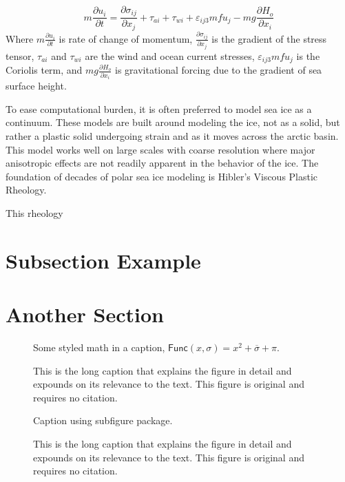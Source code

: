 \begin{equation}
m\frac{\partial u_i}{\partial t}=
\frac{\partial \sigma_{ij}}{\partial x_j}+ 
\tau_{ai}+\tau_{wi}+\varepsilon_{ij3}mfu_j-
mg\frac{\partial H_o}{\partial x_i}
\end{equation}
Where $m\frac{\partial u_i}{\partial t}$ is rate of change of momentum, $\frac{\partial \sigma_{ij}}{\partial x_j}$ is the gradient of the stress tensor, $\tau_{ai}$ and $\tau_{wi}$ are the wind and ocean current stresses, $\varepsilon_{ij3}mfu_j$ is the Coriolis term, and $mg\frac{\partial H_o}{\partial x_i}$ is gravitational forcing due to the gradient of sea surface height.

To ease computational burden, it is often preferred to model sea ice as a continuum.  These models are built around modeling the ice, not as a solid, but rather a plastic solid undergoing strain and as it moves across the arctic basin.  This model works well on large scales with coarse resolution where major anisotropic effects are not readily apparent in the behavior of the ice.  The foundation of decades of polar sea ice modeling is Hibler's Viscous Plastic Rheology.

This rheology
\section{Subsection Example}
\lipsum[56]

\section{Another Section}
\lipsum[55-56]

\begin{figure}[!htb]
\framebox[\textwidth]{\parbox{\textwidth}{\lipsum[65]}}
\caption{Some styled math in a caption, $\mathsf{Func}(x, \sigma) = x^2 + \overline{\sigma} + \pi$.}
\caption*{\small This is the long caption that explains the figure in detail
and expounds on its relevance to the text.
This figure is original and requires no citation.}
\end{figure}

\begin{figure}[!htb]
\centering
{}
\hfill
{}
\caption{Caption using subfigure package.}
\caption*{\small This is the long caption that explains the figure in detail
and expounds on its relevance to the text.
This figure is original and requires no citation.}
\end{figure}

